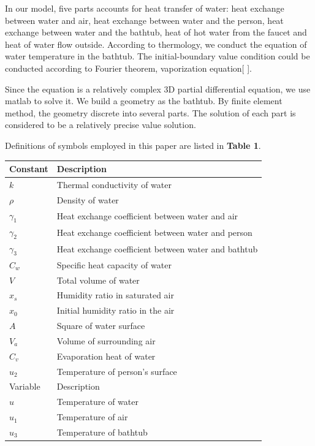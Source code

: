 \documentclass[12pt,a4paper,titlepage]{article}
\begin{document}
In our model, five parts accounts for heat transfer of water: heat exchange between water and air, heat
exchange between water and the person, heat exchange between water and the bathtub, heat of hot water from the
faucet and heat of water flow outside. According to thermology, we conduct the equation
of water temperature in the bathtub. The initial-boundary value condition could be conducted according to
Fourier theorem, vaporization equation[ ].

Since the equation is a relatively complex 3D partial differential equation, we use matlab to solve it.
We build a geometry as the bathtub. By finite element method, the geometry discrete into several parts.
The solution of each part is considered to be a relatively precise value solution.

Definitions of symbols employed in this paper are listed in
\textbf{Table 1}.
\begin{table}
\begin{tabular}{l|l}
  Constant & Description \\
  \hline
  $k$            &Thermal conductivity of water \\
  $\rho$         &Density of water \\
  ${\gamma}_1$   &Heat exchange coefficient between water and air \\
  ${\gamma}_2$   &Heat exchange coefficient between water and person \\
  ${\gamma}_3$   &Heat exchange coefficient between water and bathtub \\
  $C_w$          &Specific heat capacity of water \\
  $V$            &Total volume of water \\
  $x_s$          &Humidity ratio in saturated air \\
  $x_0$          &Initial humidity ratio in the air \\
  $A$            &Square of water surface \\
  $V_a$          &Volume of surrounding air \\
  $C_v$          &Evaporation heat of water \\
  $u_2$          &Temperature of person's surface \\

  Variable & Description \\
  \hline
  $u$            &Temperature of water \\
  $u_1$          &Temperature of air \\
  $u_3$          &Temperature of bathtub \\
\end{tabular}
\end{table}
\end{document}
